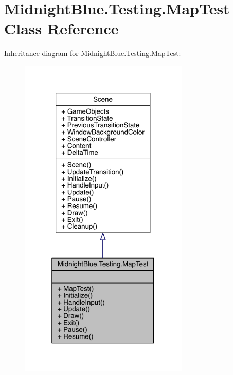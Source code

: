 \hypertarget{class_midnight_blue_1_1_testing_1_1_map_test}{}\section{Midnight\+Blue.\+Testing.\+Map\+Test Class Reference}
\label{class_midnight_blue_1_1_testing_1_1_map_test}


Inheritance diagram for Midnight\+Blue.\+Testing.\+Map\+Test\+:
\nopagebreak
\begin{figure}[H]
\begin{center}
\leavevmode
\includegraphics[width=229pt]{class_midnight_blue_1_1_testing_1_1_map_test__inherit__graph}
\end{center}
\end{figure}


